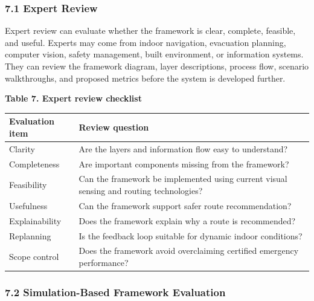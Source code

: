 \documentclass[
]{article}
\newcounter{none} %
\begin{document}
\subsubsection{7.1 Expert Review}\label{expert-review}

Expert review can evaluate whether the framework is clear, complete,
feasible, and useful. Experts may come from indoor navigation,
evacuation planning, computer vision, safety management, built
environment, or information systems. They can review the framework
diagram, layer descriptions, process flow, scenario walkthroughs, and
proposed metrics before the system is developed further.

\textbf{Table 7. Expert review checklist}

{\def\LTcaptype{none} %
\begin{longtable}[]{@{}
  >{\raggedright\arraybackslash}p{}
  >{\raggedright\arraybackslash}p{}@{}}
\toprule\noalign{}
\begin{minipage}[b]{\linewidth}\raggedright
Evaluation item
\end{minipage} & \begin{minipage}[b]{\linewidth}\raggedright
Review question
\end{minipage} \\
\midrule\noalign{}
\endhead
\bottomrule\noalign{}
\endlastfoot
Clarity & Are the layers and information flow easy to understand? \\
Completeness & Are important components missing from the framework? \\
Feasibility & Can the framework be implemented using current visual
sensing and routing technologies? \\
Usefulness & Can the framework support safer route recommendation? \\
Explainability & Does the framework explain why a route is
recommended? \\
Replanning & Is the feedback loop suitable for dynamic indoor
conditions? \\
Scope control & Does the framework avoid overclaiming certified
emergency performance? \\
\end{longtable}
}

\subsubsection{7.2 Simulation-Based Framework
Evaluation}\label{simulation-based-framework-evaluation}
\end{document}
